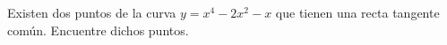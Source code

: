 \item Existen dos puntos de la curva $y = x^4 - 2x^2 - x$ que tienen una recta tangente común. Encuentre dichos puntos.
